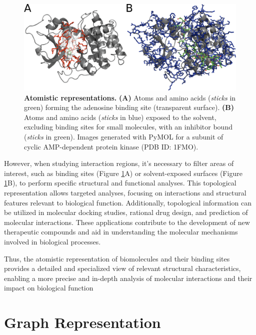 \documentclass[Ingles]{phdthesis}
\begin{document}
\begin{figure}[ht]
  \centerline{\includegraphics[scale=2]{images/atomistic-representation.png}}
  \caption[Atomistic representations]{\textbf{Atomistic representations.} \textbf{(A)} Atoms and amino acids (\textit{sticks} in green) forming the adenosine binding site (transparent surface). \textbf{(B)} Atoms and amino acids (\textit{sticks} in blue) exposed to the solvent, excluding binding sites for small molecules, with an inhibitor bound (\textit{sticks} in green). Images generated with PyMOL for a subunit of cyclic AMP-dependent protein kinase (PDB ID: 1FMO).}
  \label{fig:atomistic-representation}
\end{figure}

However, when studying interaction regions, it's necessary to filter areas of interest, such as binding sites (Figure \ref{fig:atomistic-representation}A) or solvent-exposed surfaces (Figure \ref{fig:atomistic-representation}B), to perform specific structural and functional analyses. This topological representation allows targeted analyses, focusing on interactions and structural features relevant to biological function. Additionally, topological information can be utilized in molecular docking studies, rational drug design, and prediction of molecular interactions. These applications contribute to the development of new therapeutic compounds and aid in understanding the molecular mechanisms involved in biological processes.

Thus, the atomistic representation of biomolecules and their binding sites provides a detailed and specialized view of relevant structural characteristics, enabling a more precise and in-depth analysis of molecular interactions and their impact on biological function

\section{Graph Representation \label{sec:graph-representation}}
\end{document}
